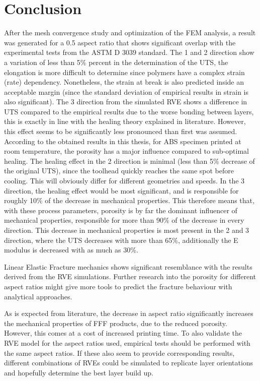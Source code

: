 \section{Conclusion}
After the mesh convergence study and optimization of the FEM analysis, a result was generated for a 0.5 aspect ratio that shows significant overlap with the experimental tests from the ASTM D 3039 standard. The 1 and 2 direction show a variation of less than 5\% percent in the determination of the UTS, the elongation is more difficult to determine since polymers have a complex strain (rate) dependency. Nonetheless, the strain at break is also predicted inside an acceptable margin (since the standard deviation of empirical results in strain is also significant). The 3 direction from the simulated RVE shows a difference in UTS compared to the empirical results due to the worse bonding between layers, this is exactly in line with the healing theory explained in literature. However, this effect seems to be significantly less pronounced than first was assumed. According to the obtained results in this thesis, for ABS specimen printed at room temperature, the porosity has a major influence compared to sub-optimal healing.  The healing effect in the 2 direction is minimal (less than 5\% decrease of the original UTS), since the toolhead quickly reaches the same spot before cooling. This will obviously differ for different geometries and speeds. In the 3 direction, the healing effect would be most significant, and is responsible for roughly 10\% of the decrease in mechanical properties. This therefore means that, with these process parameters, porosity is by far the dominant influencer of mechanical properties, responsible for more than 90\% of the decrease in every direction. This decrease in mechanical properties is most present in the 2 and 3 direction, where the UTS decreases with more than 65\%, additionally the E modulus is decreased with as much as 30\%. 

Linear Elastic Fracture mechanics shows significant resemblance with the results derived from the RVE simulations. Further research into the porosity for different aspect ratios might give more tools to predict the fracture behaviour with analytical approaches. 

As is expected from literature, the decrease in aspect ratio significantly increases the mechanical properties of FFF products, due to the reduced porosity. However, this comes at a cost of increased printing time.
To also validate the RVE model for the aspect ratios used, empirical tests should be performed with the same aspect ratios. If these also seem to provide corresponding results, different combinations of RVEs could be simulated to replicate layer orientations and hopefully determine the best layer build up.

